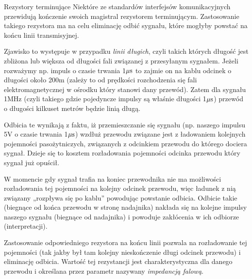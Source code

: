     \begin{center}  \end{center}
    \begin{center}  \end{center}

\begin{ProTip}[breakable]{Rezystory terminujące }
Niektóre  ze standardów interfejsów komunikacyjnych przewidują kończenie swoich magistral rezystorem terminującym.
Zastosowanie takiego rezystora ma na celu eliminację odbić sygnału, które mogłyby powstać na końcu linii transmisyjnej.

\vspace{7pt}

Zjawisko to występuje w przypadku \textit{linii długich}, czyli takich których długość jest zbliżona lub większa od długości fali związanej z przesyłanym sygnałem.
Jeżeli rozważymy np. impuls o czasie trwania 1$\mu \rm s$ to zajmie on na kablu odcinek o długości około 200m (zależy to od prędkości rozchodzenia się fali elektromagnetycznej w ośrodku który stanowi dany przewód).
Zatem dla sygnału 1MHz (czyli takiego gdzie pojedyncze impulsy są właśnie długości 1$\mu \rm s$) przewód o długości kilkuset metrów będzie linią długą.

\vspace{7pt}

Odbicia te wynikają z faktu, iż przemieszczanie się sygnału (np. naszego impulsu 5V o czasie trwania 1$\mu \rm s$) wzdłuż przewodu związane jest z
	ładowaniem kolejnych pojemności pasożytniczych, związanych z odcinkiem przewodu do którego dociera sygnał.
Dzieje się to kosztem rozładowania pojemności odcinka przewodu który sygnał już opuścił.

W momencie gdy sygnał trafia na koniec przewodnika nie ma możliwości rozładowania tej pojemności na kolejny odcinek przewodu, więc ładunek z nią związany „rozpływa się po kablu” powodując powstanie odbicia.
Odbicie takie (biegnące od końca przewodu w stronę nadajnika) nakłada się na kolejne impulsy naszego sygnału (biegnące od nadajnika) i powoduje zakłócenia w ich odbiorze (interpretacji).

Zastosowanie odpowiedniego rezystora na końcu linii pozwala na rozładowanie tej pojemności (tak jakby był tam kolejny nieskończenie długi odcinek przewodu) i eliminację odbicia.
Wartość tej rezystancji jest charakterystyczna dla danego przewodu i określana przez parametr nazywany \textit{impedancją falową}.


\end{ProTip}
